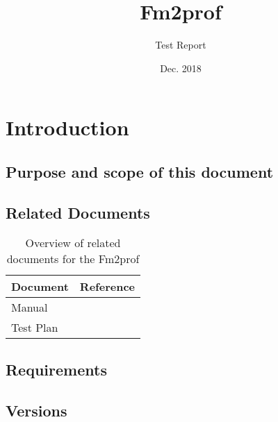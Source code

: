 \documentclass[signature]{deltares_report}
\begin{document}
\pagestyle{empty}
\cleardoublepage
%

\newcommand{\ProgramName}{Fm2prof\xspace}

\title{\ProgramName}
\subtitle{Test Report}
\classification{-}

\date{Dec. 2018}



\summary{}

\authori{}
\revieweri{}
\approvali{}

\disclaimer{}

\deltarestitle


\chapter{Introduction} 
\label{chapterIntroduction}

\section{Purpose and scope of this document} \label{sec:PurposeAndScope}


\section{Related Documents}
\label{sec:RelatedDocuments}
\bigskip
\begin{longtable}{|p{}|p{}|}
\caption{Overview of related documents for the \ProgramName \label{tab:RelatedDocuments}}\\	\hline
		\hline 
		\textbf{Document} & \textbf{Reference} \\
		\hline 
		\hline 
		Manual & \citep{Fm2prof_Manual2018} \\
		Test Plan & \citep{Fm2prof_TestPlan2018}  \\
    \hline			
\end{longtable}

\section{Requirements}
\label{sec:requirements}


\section{Versions}
\label{sec:Versions}
\end{document}

